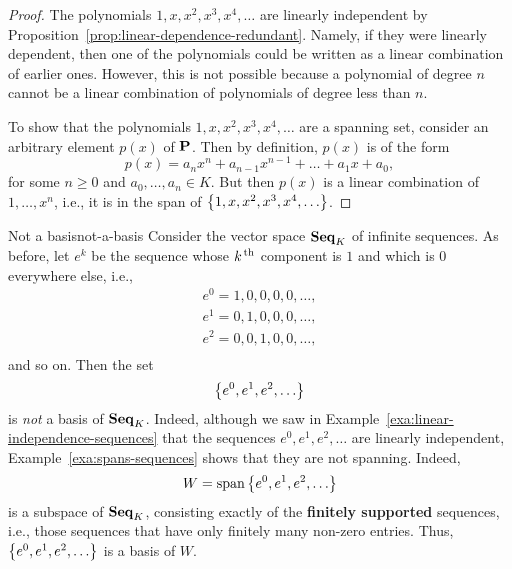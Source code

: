 \begin{proof}
  The polynomials $1, x, x^2, x^3, x^4, \ldots$ are linearly
  independent by Proposition~\ref{prop:linear-dependence-redundant}.
  Namely, if they were linearly dependent, then one of the polynomials
  could be written as a linear combination of earlier ones. However,
  this is not possible because a polynomial of degree $n$ cannot be a
  linear combination of polynomials of degree less than $n$.

  To show that the polynomials $1, x, x^2, x^3, x^4, \ldots$ are a
  spanning set, consider an arbitrary element $p(x)$ of $\mathbf{P}$.
  Then by definition, $p(x)$ is of the form
  \begin{equation*}
    p(x) = a_nx^n + a_{n-1}x^{n-1} + \ldots + a_1x + a_0,
  \end{equation*}
  for some $n\geq 0$ and $a_0,\ldots,a_n\in K$. But then $p(x)$ is a
  linear combination of $1,\ldots,x^n$, i.e., it is in the span of
  $\left\{1, x, x^2, x^3, x^4, \ldots\right\}$.
\end{proof}

\begin{example}{Not a basis}{not-a-basis}
  Consider the vector space $\mathbf{Seq}_K$ of infinite sequences. As before,
  let $e^k$ be the sequence whose $k^{\,\rm th}$ component is $1$ and which is
  $0$ everywhere else, i.e.,
    \begin{equation*}
    \begin{array}{l}
      e^0 = 1,0,0,0,0,\ldots, \\
      e^1 = 0,1,0,0,0,\ldots, \\
      e^2 = 0,0,1,0,0,\ldots, \\
    \end{array}
  \end{equation*}
  and so on. Then the set
  \begin{equation*}
    \left\{e^0, e^1, e^2, \ldots\right\}
  \end{equation*}
  is \textit{not} a basis of $\mathbf{Seq}_K$. Indeed, although we saw in
  Example~\ref{exa:linear-independence-sequences} that the sequences
  $e^0, e^1, e^2, \ldots$ are linearly independent,
  Example~\ref{exa:spans-sequences} shows that they are not spanning.
  Indeed,
  \begin{equation*}
    W = \sspan\set{e^0, e^1, e^2, \ldots}
  \end{equation*}
  is a subspace of $\mathbf{Seq}_K$, consisting exactly of the
  \textbf{finitely supported}%
   sequences, i.e., those sequences
  that have only finitely many non-zero entries. Thus, $\left\{e^0, e^1,
    e^2, \ldots\right\}$ is a basis of $W$.
\end{example}


